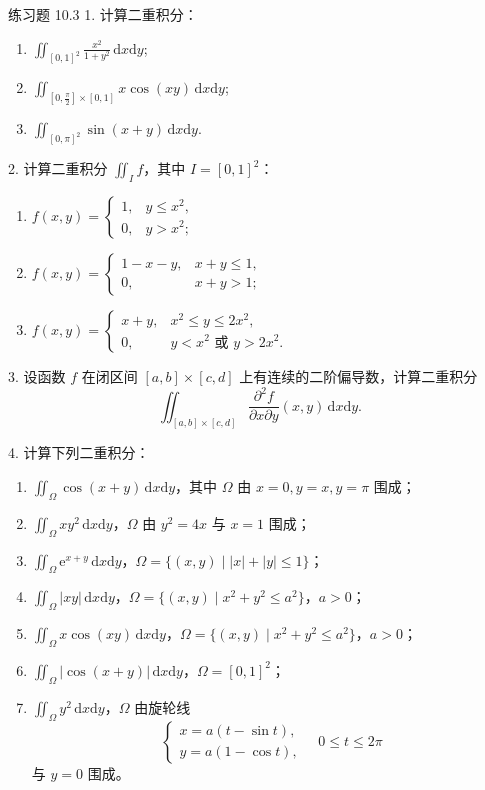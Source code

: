 \begin{exblock}{练习题 10.3}
1. 计算二重积分：
\begin{enumerate}
\item $\iint_{[0, 1]^2} \frac{x^2}{1 + y^2}\,\mathrm{d}x\mathrm{d}y$;
\item $\iint_{[0, \frac{\pi}{2}] \times [0, 1]} x \cos(xy)\,\mathrm{d}x\mathrm{d}y$;
\item $\iint_{[0, \pi]^2} \sin(x + y)\,\mathrm{d}x\mathrm{d}y$.
\end{enumerate}

2. 计算二重积分 $\iint_I f$，其中 $I = [0, 1]^2$：
\begin{enumerate}
\item $f(x, y) = \begin{cases} 1, & y \leqslant x^2, \\ 0, & y > x^2; \end{cases}$
\item $f(x, y) = \begin{cases} 1 - x - y, & x + y \leqslant 1, \\ 0, & x + y > 1; \end{cases}$
\item $f(x, y) = \begin{cases} x + y, & x^2 \leqslant y \leqslant 2x^2, \\ 0, & y < x^2 \text{ 或 } y > 2x^2. \end{cases}$
\end{enumerate}

3. 设函数 $f$ 在闭区间 $[a, b] \times [c, d]$ 上有连续的二阶偏导数，计算二重积分
\[
\iint_{[a, b] \times [c, d]} \frac{\partial^2 f}{\partial x \partial y}(x, y)\,\mathrm{d}x\mathrm{d}y.
\]

4. 计算下列二重积分：
\begin{enumerate}
\item $\iint_\Omega \cos(x + y)\,\mathrm{d}x\mathrm{d}y$，其中 $\Omega$ 由 $x = 0, y = x, y = \pi$ 围成；
\item $\iint_\Omega x y^2\,\mathrm{d}x\mathrm{d}y$，$\Omega$ 由 $y^2 = 4x$ 与 $x = 1$ 围成；
\item $\iint_\Omega \mathrm{e}^{x+y}\,\mathrm{d}x\mathrm{d}y$，$\Omega = \{(x, y) \mid |x| + |y| \leqslant 1\}$；
\item $\iint_\Omega |xy|\,\mathrm{d}x\mathrm{d}y$，$\Omega = \{(x, y) \mid x^2 + y^2 \leqslant a^2\}$，$a > 0$；
\item $\iint_\Omega x \cos(xy)\,\mathrm{d}x\mathrm{d}y$，$\Omega = \{(x, y) \mid x^2 + y^2 \leqslant a^2\}$，$a > 0$；
\item $\iint_\Omega |\cos(x + y)|\,\mathrm{d}x\mathrm{d}y$，$\Omega = [0, 1]^2$；
\item $\iint_\Omega y^2\,\mathrm{d}x\mathrm{d}y$，$\Omega$ 由旋轮线
\[
\begin{cases} x = a(t - \sin t), \\ y = a(1 - \cos t), \end{cases} \quad 0 \leqslant t \leqslant 2\pi
\]
与 $y = 0$ 围成。
\end{enumerate}


\end{exblock}
